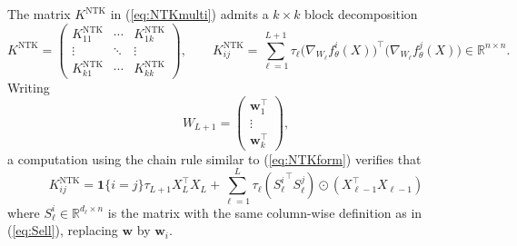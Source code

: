 \documentclass{article}
\theoremstyle{definition}
\newcommand{\R}{\mathbb{R}}
\newcommand{\NTK}{\text{NTK}}
\newcommand{\w}{\mathbf{w}}
\newcommand{\1}{\mathbf{1}}
\begin{document}
The matrix $K^\NTK$ in (\ref{eq:NTKmulti})
admits a $k \times k$ block decomposition
\[K^\NTK=\begin{pmatrix} K_{11}^\NTK & \cdots & K_{1k}^\NTK \\
\vdots & \ddots & \vdots \\
K_{k1}^\NTK & \cdots & K_{kk}^\NTK \end{pmatrix},
\qquad K_{ij}^\NTK=\sum_{\ell=1}^{L+1}
\tau_\ell \Big(\nabla_{W_\ell} f_\theta^i(X)\Big)^\top
\Big(\nabla_{W_\ell} f_\theta^j(X)\Big) \in \R^{n \times n}.\]
Writing
\[W_{L+1}=\begin{pmatrix} \w_1^\top \\ \vdots \\ \w_k^\top \end{pmatrix},\]
a computation using the chain rule similar to (\ref{eq:NTKform})
verifies that
\[K_{ij}^\NTK=\1\{i=j\}\tau_{L+1}X_L^\top X_L+\sum_{\ell=1}^L \tau_\ell
({S_\ell^i}^\top S_\ell^j) \odot (X_{\ell-1}^\top X_{\ell-1})\]
where $S_\ell^i \in \R^{d_\ell \times n}$ is the matrix with the same
column-wise definition as in (\ref{eq:Sell}), replacing $\w$ by $\w_i$.
\end{document}
